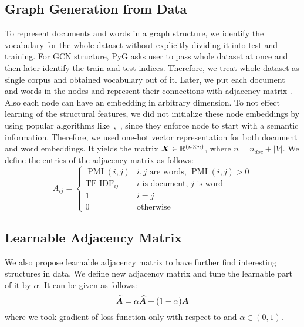 \subsection{Graph Generation from Data}
To represent documents and words in a graph structure, we identify the vocabulary for the whole dataset without explicitly dividing it into test and training. For GCN structure, PyG asks user to pass whole dataset at once and then later identify the train and test indices. Therefore, we treat whole dataset as single corpus and obtained vocabulary out of it. Later, we put each document and words in the nodes and represent their connections with adjacency matrix . Also each node can have an embedding in arbitrary dimension. To not effect learning of the structural features, we did not initialize these node embeddings by using popular algorithms like~\autocite{pennington-etal-2014-glove},~\autocite{word2vec}, since they enforce node to start with a semantic information. Therefore, we used one-hot vector representation for both document and word embeddings. It yields the matrix \(\boldsymbol{X} \in \mathbb{R}^{(n \times n)}\), where \(n = n_{doc} + |V|\). We define the entries of the adjacency matrix as follows:
\begin{equation}
    A_{i j}= \begin{cases}\operatorname{PMI}(i, j) & i, j \text { are words, } \operatorname{PMI}(i, j)>0 \\ \operatorname{TF-IDF}_{i j} & i \text { is document, } j \text { is word } \\ 1 & i=j \\ 0 & \text {otherwise }\end{cases}
\end{equation}

\subsection{Learnable Adjacency Matrix}
We also propose learnable adjacency matrix to have further find interesting structures in data. We define new adjacency matrix and tune the learnable part of it by \(\alpha \). It can be given as follows:
\begin{equation}
    \boldsymbol{\widetilde{A}} = \alpha\boldsymbol{\widehat{A}} + (1-\alpha)\boldsymbol{A}
\end{equation}
where we took gradient of loss function only with respect to  and \(\alpha \in (0,1)\).

